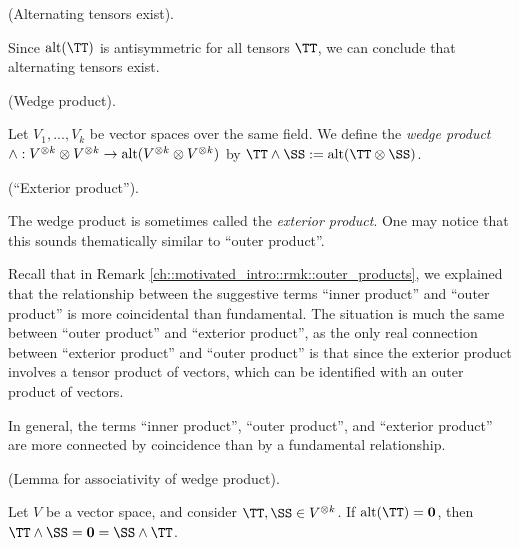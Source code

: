 \begin{remark}
    (Alternating tensors exist).

    Since $\alt(\TT)$ is antisymmetric for all tensors $\TT$, we can conclude that alternating tensors exist.
\end{remark}

\begin{defn}
    (Wedge product).
    
    Let $V_1, ..., V_k$ be vector spaces over the same field. We define the \textit{wedge product} ${\wedge: V^{\otimes k} \otimes V^{\otimes k} \rightarrow \text{alt}(V^{\otimes k} \otimes V^{\otimes k}})$ by $\TT \wedge \SS := \alt(\TT \otimes \SS)$.
\end{defn}

\begin{remark}
\label{ch::exterior_powers::rmk::exterior_product}
    (``Exterior product'').

    The wedge product is sometimes called the \textit{exterior product}. One may notice that this sounds thematically similar to ``outer product''.

    Recall that in Remark \ref{ch::motivated_intro::rmk::outer_products}, we explained that the relationship between the suggestive terms ``inner product'' and ``outer product'' is more coincidental than fundamental. The situation is much the same between ``outer product'' and ``exterior product'', as the only real connection between ``exterior product'' and ``outer product'' is that since the exterior product involves a tensor product of vectors, which can be identified with an outer product of vectors.
    
    In general, the terms ``inner product'', ``outer product'', and ``exterior product'' are more connected by coincidence than by a fundamental relationship.
\end{remark}

\begin{lemma}
    (Lemma for associativity of wedge product). 
    
    Let $V$ be a vector space, and consider $\TT, \SS \in V^{\otimes k}$. If $\alt(\TT) = \mathbf{0}$, then $\TT \wedge \SS = \mathbf{0} = \SS \wedge \TT$.
\end{lemma}

